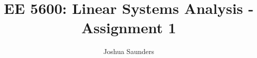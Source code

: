 \documentclass[12pt]{article}
\begin{document}

\title{EE 5600: Linear Systems Analysis - Assignment 1}%
\author{Joshua Saunders\\ %
} %

\maketitle



 \newpage
 \newpage
 \newpage
 \newpage
 \newpage
 \newpage


\end{document}
